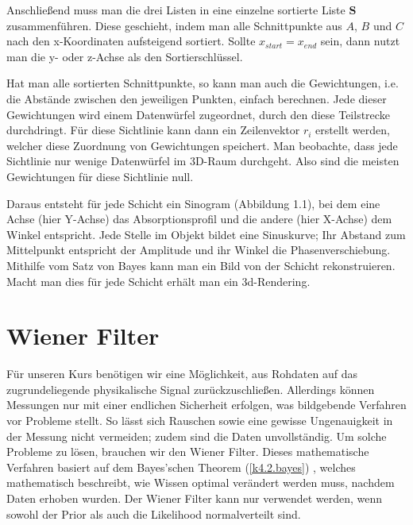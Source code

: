 \documentclass[]{dsadokumentation}
\begin{document}
Anschließend muss man die drei Listen in eine einzelne sortierte Liste $\mathbf{S}$ zusammenführen. Diese geschieht, indem man alle Schnittpunkte aus $A$, $B$ und $C$ nach den x-Koordinaten aufsteigend sortiert. Sollte $x_{start} = x_{end}$ sein, dann nutzt man die y- oder z-Achse als den Sortierschlüssel.

Hat man alle sortierten Schnittpunkte, so kann man auch die Gewichtungen, i.e. die Abstände zwischen den jeweiligen Punkten, einfach berechnen. Jede dieser Gewichtungen wird einem Datenwürfel zugeordnet, durch den diese Teilstrecke durchdringt. Für diese Sichtlinie kann dann ein Zeilenvektor $r_i$ erstellt werden, welcher diese Zuordnung von Gewichtungen speichert. Man beobachte, dass jede Sichtlinie nur wenige Datenwürfel im 3D-Raum durchgeht. Also sind die meisten Gewichtungen für diese Sichtlinie null.

Daraus entsteht für jede Schicht ein Sinogram (Abbildung 1.1), bei dem eine Achse (hier Y-Achse) das Absorptionsprofil und die andere (hier X-Achse) dem Winkel entspricht. Jede Stelle im Objekt bildet eine Sinuskurve; Ihr Abstand zum Mittelpunkt entspricht der Amplitude und ihr Winkel die Phasenverschiebung. Mithilfe vom Satz von Bayes kann man ein Bild von der Schicht rekonstruieren. Macht man dies für jede Schicht erhält man ein 3d-Rendering.



\section{Wiener Filter}\label{k4.2.wiener.filter}

Für unseren Kurs benötigen wir eine Möglichkeit, aus Rohdaten auf das zugrundeliegende physikalische Signal zurückzuschließen. Allerdings können Messungen nur mit einer endlichen Sicherheit erfolgen, was bildgebende Verfahren vor Probleme stellt. So lässt sich Rauschen sowie eine gewisse Ungenauigkeit in der Messung nicht vermeiden; zudem sind die Daten unvollständig. Um solche Probleme zu lösen, brauchen wir den Wiener Filter.
Dieses mathematische Verfahren basiert auf dem Bayes'schen Theorem
(\ref{k4.2.bayes})
, welches mathematisch beschreibt, wie Wissen optimal verändert werden muss, nachdem Daten erhoben wurden. Der Wiener Filter kann nur verwendet werden, wenn sowohl der Prior als auch die Likelihood normalverteilt sind.
\end{document}
